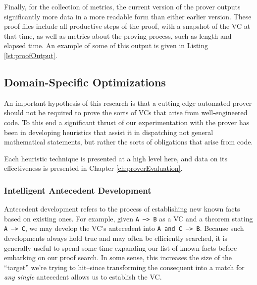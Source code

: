 Finally, for the collection of metrics, the current version of the prover outputs significantly more data in a more readable form than either earlier version.  These proof files include all productive steps of the proof, with a snapshot of the VC at that time, as well as metrics about the proving process, such as length and elapsed time.  An example of some of this output is given in Listing \ref{lst:proofOutput}.



	\subsection{Domain-Specific Optimizations\label{domainSpecific}}

An important hypothesis of this research is that a cutting-edge automated prover should not be required to prove the sorts of VCs that arise from well-engineered code.  To this end a significant thrust of our experimentation with the prover has been in developing heuristics that assist it in dispatching not general mathematical statements, but rather the sorts of obligations that arise from code.

Each heuristic technique is presented at a high level here, and data on its effectiveness is presented in Chapter \ref{ch:proverEvaluation}.

		\subsubsection{Intelligent Antecedent Development}

Antecedent development refers to the process of establishing new known facts based on existing ones.  For example, given \texttt{A ---> B} as a VC and a theorem stating \texttt{A ---> C}, we may develop the VC's antecedent into \texttt{A and C ---> B}.  Because such developments always hold true and may often be efficiently searched, it is generally useful to spend some time expanding our list of known facts before embarking on our proof search.  In some sense, this increases the size of the ``target'' we're trying to hit--since transforming the consequent into a match for \emph{any single} antecedent allows us to establish the VC.

